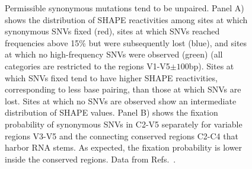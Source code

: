 \documentclass[11pt]{article}
\newcommand{\shankaregion}{C2-V5}
\begin{document}
\begin{figure}
\begin{center}
\caption{Permissible synonymous mutations tend to be unpaired.
Panel A) shows the distribution of SHAPE reactivities among sites at which synonymous 
SNVs fixed (red), sites at which SNVs reached frequencies above 15\% but
were subsequently lost (blue), and sites at which no high-frequency SNVs were observed (green) 
(all categories are restricted to the regions V1-V5$\pm 100$bp).
Sites at which SNVs fixed tend to have higher SHAPE reactivities, corresponding to
less base pairing, than those at which SNVs are lost.
Sites at which no SNVs are observed show an intermediate distribution of SHAPE values.
Panel B) shows the fixation probability of synonymous SNVs in
\shankaregion{} separately for variable regions V3-V5 and the connecting conserved 
regions C2-C4 that harbor RNA stems. As expected, the fixation probability is lower
inside the conserved regions. Data from Refs.~\cite{shankarappa_consistent_1999,
bunnik_autologous_2008, liu_selection_2006}.}
\label{fig:SHAPE}
\end{center}
\end{figure}
\end{document}
